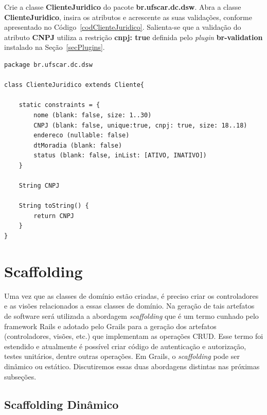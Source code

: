 \vspace{0.2cm}

Crie a  classe {\bf ClienteJuridico}  do pacote {\bf br.ufscar.dc.dsw}.   Abra a
classe  {\bf  ClienteJuridico},  insira   os  atributos  e  acrescente  as  suas
validações,    conforme    apresentado    no    Código~\ref{codClienteJuridico}.
Salienta-se  que a validação  do atributo  {\bf CNPJ}  utiliza a  restrição {\bf
  cnpj:  true}  definida pelo  {\it  plugin}  {\bf  br-validation} instalado  na
Seção~\ref{secPlugins}. 

\begin{lstlisting}[caption=Classe  de  domínio  {\bf ClienteJuridico},  frame  =
    trBL, float=htbp, label=codClienteJuridico] 
package br.ufscar.dc.dsw

class ClienteJuridico extends Cliente{
    
    static constraints = {
        nome (blank: false, size: 1..30)
        CNPJ (blank: false, unique:true, cnpj: true, size: 18..18)
        endereco (nullable: false)
        dtMoradia (blank: false)
        status (blank: false, inList: [ATIVO, INATIVO])
    }
    
    String CNPJ
    
    String toString() {
        return CNPJ
    }
}
\end{lstlisting}

\newpage

\section{Scaffolding}\label{Scaffolding}

Uma  vez  que  as  classes  de   domínio  estão  criadas,  é  preciso  criar  os
controladores e as  visões relacionados a essas classes  de domínio.  Na geração
de tais artefatos de software será utilizada a abordagem {\it scaffolding} que é
um termo cunhado  pelo framework Rails e adotado pelo Grails  para a geração dos
artefatos (controladores, visões, etc.)  que implementam as operações CRUD. Esse
termo  foi estendido  e atualmente  é possível  criar código  de  autenticação e
autorização,  testes  unitários, dentre  outras  operações.  Em  Grails, o  {\it
  scaffolding}  pode   ser  dinâmico  ou  estático.    Discutiremos  essas  duas
abordagens distintas nas próximas subseções.

\subsection{Scaffolding Dinâmico}

